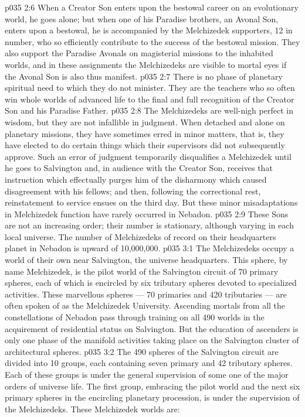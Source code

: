 \vs p035 2:6 When a Creator Son enters upon the bestowal career on an evolutionary world, he goes alone; but when one of his Paradise brothers, an Avonal Son, enters upon a bestowal, he is accompanied by the Melchizedek supporters, 12 in number, who so efficiently contribute to the success of the bestowal mission. They also support the Paradise Avonals on magisterial missions to the inhabited worlds, and in these assignments the Melchizedeks are visible to mortal eyes if the Avonal Son is also thus manifest.
\vs p035 2:7 There is no phase of planetary spiritual need to which they do not minister. They are the teachers who so often win whole worlds of advanced life to the final and full recognition of the Creator Son and his Paradise Father.
\vs p035 2:8 \pc The Melchizedeks are well\hyp{}nigh perfect in wisdom, but they are not infallible in judgment. When detached and alone on planetary missions, they have sometimes erred in minor matters, that is, they have elected to do certain things which their supervisors did not subsequently approve. Such an error of judgment temporarily disqualifies a Melchizedek until he goes to Salvington and, in audience with the Creator Son, receives that instruction which effectually purges him of the disharmony which caused disagreement with his fellows; and then, following the correctional rest, reinstatement to service ensues on the third day. But these minor misadaptations in Melchizedek function have rarely occurred in Nebadon.
\vs p035 2:9 These Sons are not an increasing order; their number is stationary, although varying in each local universe. The number of Melchizedeks of record on their headquarters planet in Nebadon is upward of 10,000,000.
\vs p035 3:1 The Melchizedeks occupy a world of their own near Salvington, the universe headquarters. This sphere, by name Melchizedek, is the pilot world of the Salvington circuit of 70 primary spheres, each of which is encircled by six tributary spheres devoted to specialized activities. These marvellous spheres --- 70 primaries and 420 tributaries --- are often spoken of as the Melchizedek University. Ascending mortals from all the constellations of Nebadon pass through training on all 490 worlds in the acquirement of residential status on Salvington. But the education of ascenders is only one phase of the manifold activities taking place on the Salvington cluster of architectural spheres.
\vs p035 3:2 The 490 spheres of the Salvington circuit are divided into 10 groups, each containing seven primary and 42 tributary spheres. Each of these groups is under the general supervision of some one of the major orders of universe life. The first group, embracing the pilot world and the next six primary spheres in the encircling planetary procession, is under the supervision of the Melchizedeks. These Melchizedek worlds are:
